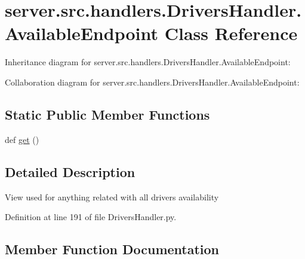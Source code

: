 \hypertarget{classserver_1_1src_1_1handlers_1_1_drivers_handler_1_1_available_endpoint}{}\section{server.\+src.\+handlers.\+Drivers\+Handler.\+Available\+Endpoint Class Reference}
\label{classserver_1_1src_1_1handlers_1_1_drivers_handler_1_1_available_endpoint}


Inheritance diagram for server.\+src.\+handlers.\+Drivers\+Handler.\+Available\+Endpoint\+:


Collaboration diagram for server.\+src.\+handlers.\+Drivers\+Handler.\+Available\+Endpoint\+:
\subsection*{Static Public Member Functions}
\begin{DoxyCompactItemize}
\item 
def \hyperlink{classserver_1_1src_1_1handlers_1_1_drivers_handler_1_1_available_endpoint_adf2443d945d12423e7c236092acfac65}{get} ()
\end{DoxyCompactItemize}


\subsection{Detailed Description}
\begin{DoxyVerb}View used for anything related with all drivers availability \end{DoxyVerb}
 

Definition at line 191 of file Drivers\+Handler.\+py.



\subsection{Member Function Documentation}
